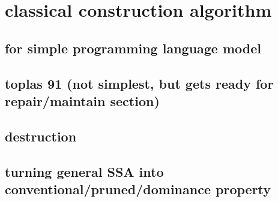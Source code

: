 \chapter{classical construction algorithm}



\section{for simple programming language model}
\section{toplas 91 (not simplest, but gets ready for repair/maintain section)}
\section{destruction}
\section{turning general SSA into conventional/pruned/dominance property}


